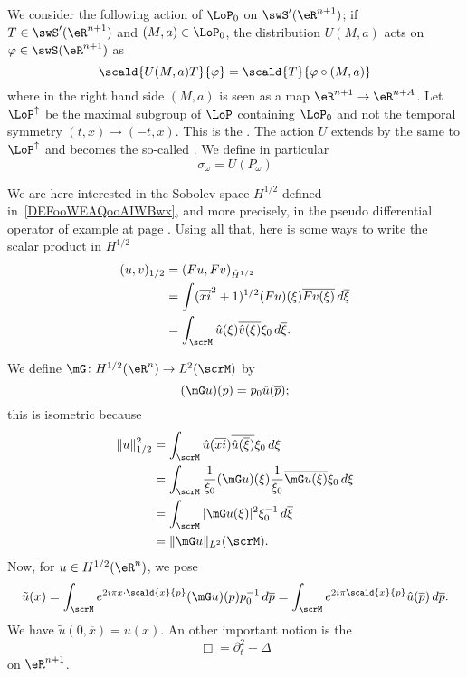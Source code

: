 We consider the following action of $\LoP_0$ on $\swS'(\eR^{n+1})$; if $T\in\swS'(\eR^{n+1})$ and $(M,a)\in\LoP_0$, the distribution $U(M,a)$ acts on $\varphi\in\swS(\eR^{n+1})$ as
\begin{equation}
	\scald{ U(M,a)T }{ \varphi }=\scald{ T }{ \varphi\circ(M,a) }
\end{equation}
where in the right hand side $(M,a)$ is seen as a map $\eR^{n+1}\to\eR^{n+A}$. Let $\LoP^{\uparrow}$ be the maximal subgroup of $\LoP$ containing $\LoP_0$ and not the temporal symmetry $(t,\overline{x})\to(-t,\overline{x})$. This is the . The action $U$ extends by the same to $\LoP^{\uparrow}$ and becomes the so-called . We define in particular
\begin{equation}
	\sigma_{\omega}=U(P_{\omega})
\end{equation}

We are here interested in the Sobolev space $H^{1/2}$ defined in~\ref{DEFooWEAQooAIWBwx}, and more precisely, in the pseudo differential operator of example at page \pageref{pg_exem_psdo}. Using all that, here is some ways to write the scalar product in $H^{1/2}$
\begin{equation}
	\begin{split}
		(u,v)_{1/2}&=(Fu,Fv)_{\hat H^{1/2}}\\
		&=\int (\overline{xi}^2+1)^{1/2}(Fu)(\xi)\overline{ Fv(\xi) }\,d\overline{ \xi }\\
		&=\int_{\scrM}\hat u(\xi)\overline{ \hat v(\xi) }\xi_0\,d\overline{ \xi }.
	\end{split}
\end{equation}

We define $\mG\colon H^{1/2}(\eR^n)\to L^2(\scrM)$ by
\begin{equation}
	(\mG u)(p)=p_0\hat u(\overline{p});
\end{equation}
this is isometric because
\[
	\begin{split}
		\| u \|_{1/2}^2&=\int_{\scrM}\hat u(\overline{xi})\overline{ \hat u(\overline{ \xi }) }\xi_0\,d\xi\\
		&=\int_{\scrM}\frac{1}{ \xi_0 }(\mG u)(\xi)\frac{1}{ \xi_0 }\overline{ \mG u(\xi) }\xi_0\,d\xi\\
		&=\int_{\scrM}| \mG u(\xi) |^2\xi_0^{-1}\,d\overline{ \xi }\\
		&=\| \mG u \|_{L^2}(\scrM).
	\end{split}
\]
Now, for $u\in H^{1/2}(\eR^n)$, we pose
\begin{equation}
	\tilde u(x)=\int_{\scrM} e^{2i\pi x\cdot\scald{ x }{ p } }(\mG u)(p)p_0^{-1}\,d\overline{p}
	=\int_{\scrM} e^{2i\pi\scald{ x }{ p }}\hat u(\overline{p})\,d\overline{p}.
\end{equation}
We have $\tilde u(0,\overline{x})=u(x)$. An other important notion is the 
\[
	\Box=\partial_t^2-\Delta
\]
on $\eR^{n+1}$.


